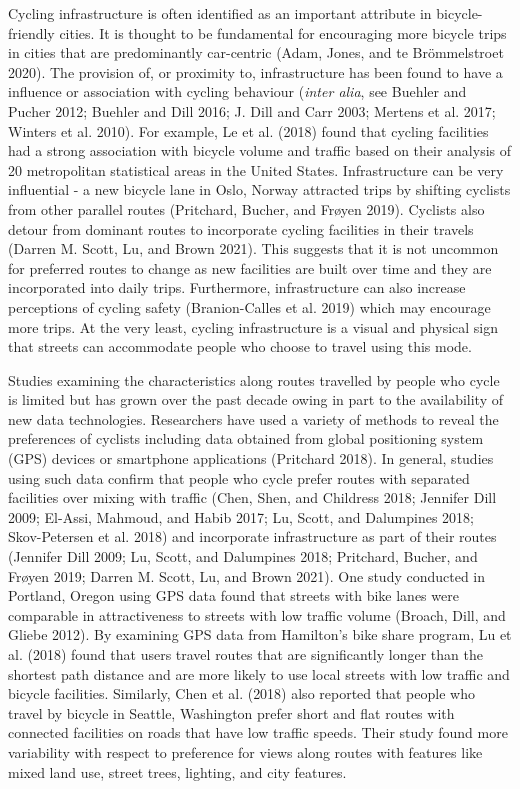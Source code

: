 \documentclass[smallextended]{svjour3}       %
\begin{document}
Cycling infrastructure is often identified as an important attribute in
bicycle-friendly cities. It is thought to be fundamental for encouraging
more bicycle trips in cities that are predominantly car-centric (Adam,
Jones, and te Brömmelstroet 2020). The provision of, or proximity to,
infrastructure has been found to have a influence or association with
cycling behaviour (\emph{inter alia}, see Buehler and Pucher 2012;
Buehler and Dill 2016; J. Dill and Carr 2003; Mertens et al. 2017;
Winters et al. 2010). For example, Le et al. (2018) found that cycling
facilities had a strong association with bicycle volume and traffic
based on their analysis of 20 metropolitan statistical areas in the
United States. Infrastructure can be very influential - a new bicycle
lane in Oslo, Norway attracted trips by shifting cyclists from other
parallel routes (Pritchard, Bucher, and Frøyen 2019). Cyclists also
detour from dominant routes to incorporate cycling facilities in their
travels (Darren M. Scott, Lu, and Brown 2021). This suggests that it is
not uncommon for preferred routes to change as new facilities are built
over time and they are incorporated into daily trips. Furthermore,
infrastructure can also increase perceptions of cycling safety
(Branion-Calles et al. 2019) which may encourage more trips. At the very
least, cycling infrastructure is a visual and physical sign that streets
can accommodate people who choose to travel using this mode.

Studies examining the characteristics along routes travelled by people
who cycle is limited but has grown over the past decade owing in part to
the availability of new data technologies. Researchers have used a
variety of methods to reveal the preferences of cyclists including data
obtained from global positioning system (GPS) devices or smartphone
applications (Pritchard 2018). In general, studies using such data
confirm that people who cycle prefer routes with separated facilities
over mixing with traffic (Chen, Shen, and Childress 2018; Jennifer Dill
2009; El-Assi, Mahmoud, and Habib 2017; Lu, Scott, and Dalumpines 2018;
Skov-Petersen et al. 2018) and incorporate infrastructure as part of
their routes (Jennifer Dill 2009; Lu, Scott, and Dalumpines 2018;
Pritchard, Bucher, and Frøyen 2019; Darren M. Scott, Lu, and Brown
2021). One study conducted in Portland, Oregon using GPS data found that
streets with bike lanes were comparable in attractiveness to streets
with low traffic volume (Broach, Dill, and Gliebe 2012). By examining
GPS data from Hamilton's bike share program, Lu et al. (2018) found that
users travel routes that are significantly longer than the shortest path
distance and are more likely to use local streets with low traffic and
bicycle facilities. Similarly, Chen et al. (2018) also reported that
people who travel by bicycle in Seattle, Washington prefer short and
flat routes with connected facilities on roads that have low traffic
speeds. Their study found more variability with respect to preference
for views along routes with features like mixed land use, street trees,
lighting, and city features.
\end{document}
